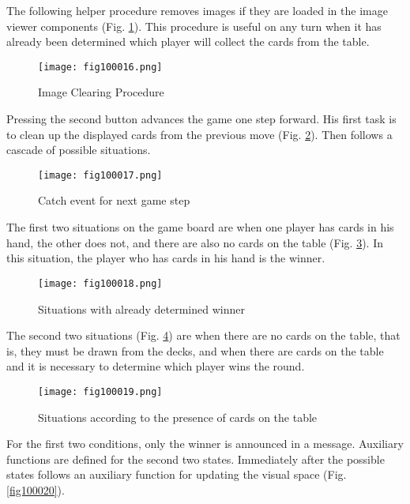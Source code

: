 The following helper procedure removes images if they are loaded in the image viewer components (Fig. \ref{fig100016}). This procedure is useful on any turn when it has already been determined which player will collect the cards from the table.

\begin{figure}[H]
   \centering
   \texttt{[image: fig100016.png]}
   \caption{Image Clearing Procedure}
\label{fig100016}
\end{figure}

Pressing the second button advances the game one step forward. His first task is to clean up the displayed cards from the previous move (Fig. \ref{fig100017}). Then follows a cascade of possible situations.

\begin{figure}[H]
   \centering
   \texttt{[image: fig100017.png]}
   \caption{Catch event for next game step}
\label{fig100017}
\end{figure}

The first two situations on the game board are when one player has cards in his hand, the other does not, and there are also no cards on the table (Fig. \ref{fig100018}). In this situation, the player who has cards in his hand is the winner.

\begin{figure}[H]
   \centering
   \texttt{[image: fig100018.png]}
   \caption{Situations with already determined winner}
\label{fig100018}
\end{figure}

The second two situations (Fig. \ref{fig100019}) are when there are no cards on the table, that is, they must be drawn from the decks, and when there are cards on the table and it is necessary to determine which player wins the round.

\begin{figure}[H]
   \centering
   \texttt{[image: fig100019.png]}
   \caption{Situations according to the presence of cards on the table}
\label{fig100019}
\end{figure}

For the first two conditions, only the winner is announced in a message. Auxiliary functions are defined for the second two states. Immediately after the possible states follows an auxiliary function for updating the visual space (Fig. \ref{fig100020}).

